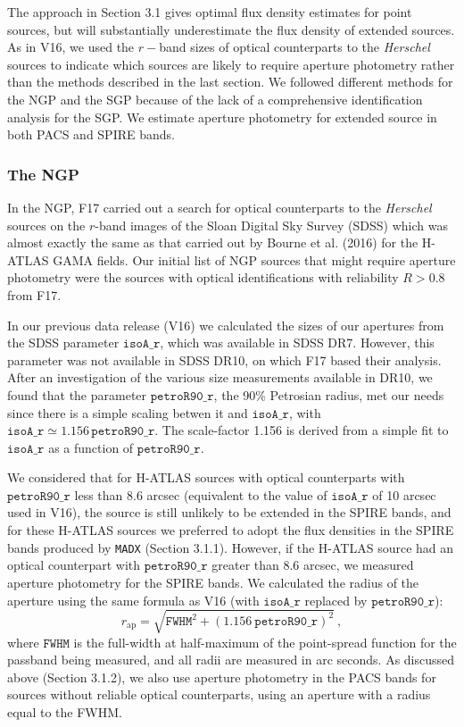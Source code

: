 \documentclass[a4paper,fleqn,usenatbib, twocolumn]{aastex61}
\begin{document}
The approach in Section 3.1 gives optimal flux density estimates for
point sources, but will substantially underestimate the flux density
of extended sources.  As in V16, we used the $r-$band sizes of optical
counterparts to the {\it Herschel} sources to indicate which sources
are likely to require aperture photometry rather than the methods
described in the last section.  We followed different methods for the
NGP and the SGP because of the lack of a comprehensive identification
analysis for the SGP. We estimate aperture photometry for extended
source in both PACS and SPIRE bands.

\subsubsection{The NGP}

In the NGP, F17 carried out a search for optical counterparts to the
{\it Herschel} sources on the $r$-band images of the Sloan Digital Sky
Survey (SDSS) which was almost exactly the same as that carried out by
Bourne et al. (2016) for the H-ATLAS GAMA fields.  Our initial list of
NGP sources that might require aperture photometry were the sources
with optical identifications with reliability $R>0.8$ from F17.

In our previous data release (V16) we calculated the sizes of our
apertures from the SDSS parameter $\mathtt{isoA\_r}$, which was
available in SDSS DR7. However, this parameter was not available in
SDSS DR10, on which F17 based their analysis.  After an investigation
of the various size measurements available in DR10, we found that the
parameter $\mathtt{petroR90\_r}$, the 90\% Petrosian radius, met our
needs since there is a simple scaling betwen it and
$\mathtt{isoA\_r}$, with
$\mathtt{isoA\_r} \simeq 1.156 \, \mathtt{petroR90\_r}$.
The scale-factor 1.156 is derived from a simple fit to
$\mathtt{isoA\_r}$ as a function of $\mathtt{petroR90\_r}$.

We considered that for H-ATLAS sources with optical counterparts with
$\mathtt{petroR90\_r}$ less than 8.6 arcsec (equivalent to the value
of $\mathtt{isoA\_r}$ of 10 arcsec used in V16), the source is still
unlikely to be extended in the SPIRE bands, and for these H-ATLAS
sources we preferred to adopt the flux densities in the SPIRE bands produced by
{\tt MADX} (Section 3.1.1).  However, if the H-ATLAS source had an
optical counterpart with $\mathtt{petroR90\_r}$ greater than 8.6
arcsec, we measured aperture photometry for the SPIRE bands. We
calculated the radius of the aperture using the same formula as V16
(with $\mathtt{isoA\_r}$ replaced by $\mathtt{petroR90\_r}$):
\smallskip
\begin{equation} 
r_\mathrm{ap} = \sqrt{ \mathtt{FWHM}^2 + {(1.156
    \ \mathtt{petroR90\_r})}^2}\ , 
\end{equation}
where $\mathtt{FWHM}$ is the full-width at half-maximum of the
point-spread function for the passband being measured, and all radii
are measured in arc seconds. As discussed
above (Section 3.1.2), we also use aperture photometry in the PACS
bands for sources without reliable optical counterparts, using an
aperture with a radius equal to the FWHM.
\end{document}
